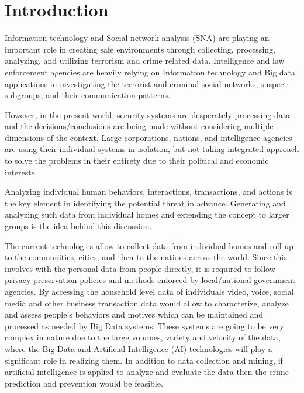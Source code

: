 \documentclass[sigconf]{acmart}
\begin{document}

\maketitle

\section{Introduction}
Information technology and Social network analysis (SNA) are playing an important role in creating safe environments through collecting, processing, analyzing, and utilizing terrorism and crime related data\cite{Kantor2005}. Intelligence and law enforcement agencies are heavily relying on Information technology and Big data applications in investigating the terrorist and criminal social networks, suspect subgroups, and their communication patterns.

However, in the present world, security systems are desperately processing data and the decisions/conclusions are being made without considering multiple dimensions of the context. Large corporations, nations, and intelligence agencies are using their individual systems in isolation, but not taking integrated approach to solve the problems in their entirety due to their political and economic interests.

Analyzing individual human behaviors, interactions, transactions, and actions is the key element in identifying the potential threat in advance. Generating and analyzing such data from individual homes and extending the concept to larger groups is the idea behind this discussion.

The current technologies allow to collect data from individual homes and roll up to the communities, cities, and then to the nations across the world. Since this involves with the personal data from people directly, it is required to follow privacy-preservation policies and methods enforced by local/national government agencies. By accessing the household level data of individuals video, voice, social media and other business transaction data would allow to characterize, analyze and assess people's behaviors and motives which can be maintained and processed as needed by Big Data systems. These systems are going to be very complex in nature due to the large volumes, variety and velocity of the data, where the Big Data and Artificial Intelligence (AI) technologies will play a significant role in realizing them. In addition to data collection and mining, if artificial intelligence is applied to analyze and evaluate the data then the crime prediction and prevention would be feasible.
\end{document}
